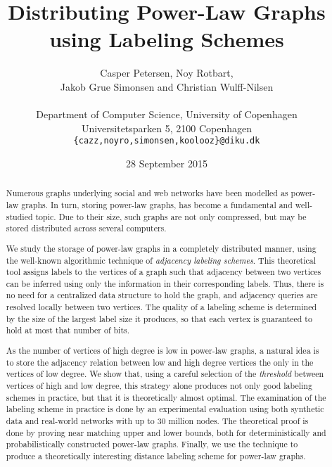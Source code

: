\documentclass{acm_proc_article-sp}
\begin{document}
\title{Distributing Power-Law Graphs using Labeling Schemes}

\author{Casper Petersen, Noy Rotbart,\\ Jakob Grue Simonsen and Christian Wulff-Nilsen \\ \\
\small{Department of Computer Science, University of Copenhagen} \\
\small{Universitetsparken 5, 2100 Copenhagen}\\
 \small{\texttt{\{cazz,noyro,simonsen,koolooz\}@diku.dk}}  }
 

\date{28 September 2015}
\maketitle
\begin{abstract}
Numerous graphs underlying social and web networks  have been modelled as power-law graphs.
In turn, storing power-law graphs, has become  a fundamental and  well-studied topic.
Due to their size, such graphs are not only compressed, but may be stored distributed across several computers.

We study the storage of  power-law graphs in a completely distributed manner, using the well-known algorithmic technique of \emph{adjacency labeling schemes}.
This theoretical tool assigns  labels to the vertices of a graph such that   adjacency between two vertices can be inferred using only the information in their corresponding labels. Thus, there is no need for a centralized data structure to hold the graph, and adjacency queries are resolved locally between two vertices. The quality of a labeling scheme is determined by the size of the largest label size it produces, so that each vertex is guaranteed to hold at most that number of bits.

As the number of vertices of high degree is low in power-law graphs, a natural idea is to store the adjacency relation between low and high degree vertices the only in the vertices of  low degree. 
We show that, using  a careful selection of the \emph{threshold} between vertices of high and low degree, this strategy alone produces not only good labeling schemes in practice, but that it is theoretically almost optimal. 
The examination of the labeling scheme in practice is done by an experimental evaluation using both synthetic data and real-world networks with up to 30 million nodes.
The theoretical proof is done by proving near matching upper and lower bounds, both for deterministically and probabilistically  constructed power-law graphs.
Finally, we use the  technique  to produce a  theoretically interesting distance labeling scheme for power-law graphs.
\end{abstract}
\end{document}
